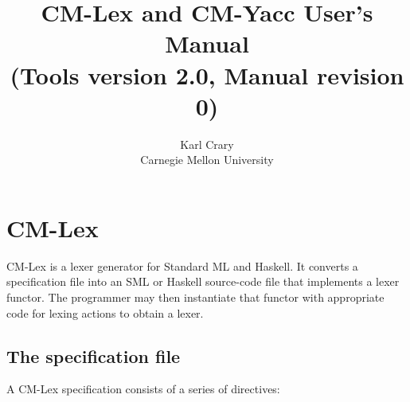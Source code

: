 \documentclass[10pt]{article}
\title{CM-Lex and CM-Yacc User's Manual \\ \Large
(Tools version 2.0, Manual revision 0)}
\author{Karl Crary \\ Carnegie Mellon University}
\begin{document}
\maketitle

\section{CM-Lex}

CM-Lex is a lexer generator for Standard ML and Haskell.  It converts
a specification file into an SML or Haskell source-code file that
implements a lexer functor.  The programmer may then instantiate that
functor with appropriate code for lexing actions to obtain a lexer.

\subsection{The specification file}

A CM-Lex specification consists of a series of directives:
\end{document}
